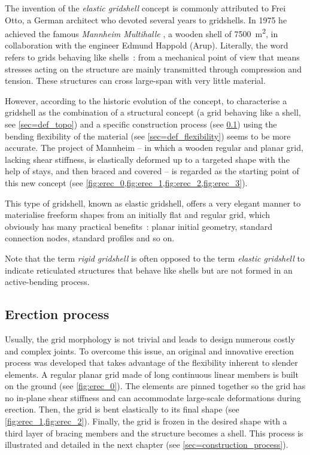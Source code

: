 The invention of the \emph{elastic gridshell} concept is commonly attributed to Frei Otto, a German architect who devoted several years to gridshells. In 1975 he achieved the famous \emph{Mannheim Multihalle} \cite{Happold1975}, a wooden shell of 7500~m\textsuperscript{2}, in collaboration with the engineer Edmund Happold (Arup).
Literally, the word  refers to grids behaving like shells~: from a mechanical point of view that means stresses acting on the structure are mainly transmitted through compression and tension. These structures can cross large-span with very little material.

However, according to the historic evolution of the concept, to characterise a gridshell as the combination of a structural concept (a grid behaving like a shell, see \cref{sec=def_topo}) and a specific construction process (see \cref{sec=def_erec}) using the bending flexibility of the material (see \cref{sec=def_flexibility}) seems to be more accurate. The project of Mannheim -- in which a wooden regular and planar grid, lacking shear stiffness, is elastically deformed up to a targeted shape with the help of stays, and then braced and covered -- is regarded as the starting point of this new concept (see \cref{fig:erec_0,fig:erec_1,fig:erec_2,fig:erec_3}).

This type of gridshell, known as elastic gridshell, offers a very elegant manner to materialise freeform shapes from an initially flat and regular grid, which obviously has many practical benefits~: planar initial geometry, standard connection nodes, standard profiles and so on.

Note that the term \emph{rigid gridshell} is often opposed to the term \emph{elastic gridshell} to indicate reticulated structures that behave like shells but are not formed in an active-bending process.

\subsection{Erection process}\label{sec=def_erec}
Usually, the grid morphology is not trivial and leads to design numerous costly and complex joints. To overcome this issue, an original and innovative erection process was developed that takes advantage of the flexibility inherent to slender elements. A regular planar grid made of long continuous linear members is built on the ground (see \cref{fig:erec_0}). The elements are pinned together so the grid has no in-plane shear stiffness and can accommodate large-scale deformations during erection. Then, the grid is bent elastically to its final shape (see \cref{fig:erec_1,fig:erec_2}). Finally, the grid is frozen in the desired shape with a third layer of bracing members and the structure becomes a shell. This process is illustrated and detailed in the next chapter (see \cref{sec=construction_process}).

